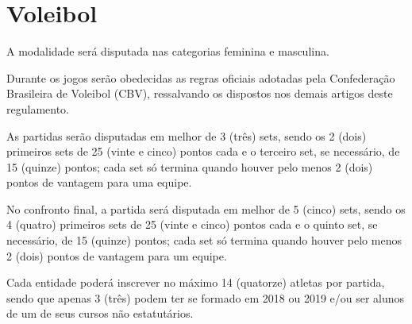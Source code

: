 {\let\clearpage\relax \chapter{Voleibol}}

\begin{article}
	A modalidade será disputada nas categorias feminina e masculina.
\end{article}

\begin{article}
	Durante os jogos serão obedecidas as regras oficiais adotadas pela Confederação Brasileira de Voleibol (CBV), ressalvando os dispostos nos demais artigos deste regulamento.
\end{article}

\begin{article}
	As partidas serão disputadas em melhor de 3 (três) sets, sendo os 2 (dois) primeiros sets de 25 (vinte e cinco) pontos cada e o terceiro set, se necessário, de 15 (quinze) pontos; cada set só termina quando houver pelo menos 2 (dois) pontos de vantagem para uma equipe.

	\begin{xparagraph}
		No confronto final, a partida será disputada em melhor de 5 (cinco) sets, sendo os 4 (quatro) primeiros sets de 25 (vinte e cinco) pontos cada e o quinto set, se necessário, de 15 (quinze) pontos; cada set só termina quando houver pelo menos 2 (dois) pontos de vantagem para um equipe.
	\end{xparagraph}
\end{article}

\begin{article}
	Cada entidade poderá inscrever no máximo 14 (quatorze) atletas por partida, sendo que apenas 3 (três) podem ter se formado em 2018 ou 2019 e/ou ser alunos de um de seus cursos não estatutários.
\end{article}
